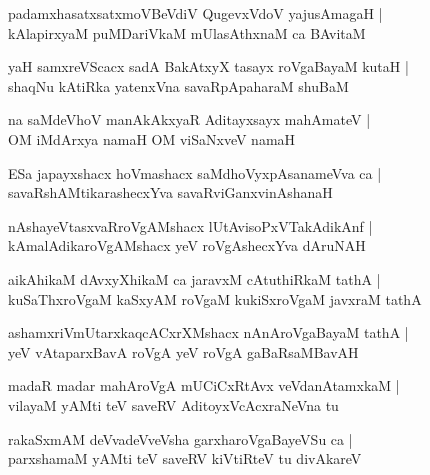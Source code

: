 \documentclass[twoside,12pt,openright]{book}
\newcounter{shloka}[chapter]
\begin{document}
\begin{shloka}%
padamxhasatxsatxmoVBeVdiV QugevxVdoV yajusAmagaH |\\
kAlapirxyaM puMDariVkaM mUlasAthxnaM ca BAvitaM 
\end{shloka}

\begin{shloka}%
yaH samxreVScacx sadA BakAtxyX tasayx roVgaBayaM kutaH |\\
shaqNu kAtiRka yatenxVna savaRpApaharaM shuBaM 
\end{shloka}

\begin{shloka}%
na saMdeVhoV manAkAkxyaR Aditayxsayx mahAmateV |\\
OM iMdArxya namaH OM viSaNxveV namaH
\end{shloka}

\begin{shloka}%
ESa japayxshacx hoVmashacx saMdhoVyxpAsanameVva ca |\\
savaRshAMtikarashecxYva savaRviGanxvinAshanaH
\end{shloka}

\begin{shloka}%
nAshayeVtasxvaRroVgAMshacx lUtAvisoPxVTakAdikAnf |\\
kAmalAdikaroVgAMshacx yeV roVgAshecxYva dAruNAH
\end{shloka}

\begin{shloka}%
aikAhikaM dAvxyXhikaM ca jaravxM cAtuthiRkaM tathA |\\
kuSaThxroVgaM kaSxyAM roVgaM kukiSxroVgaM javxraM tathA 
\end{shloka}

\begin{shloka}%
ashamxriVmUtarxkaqcACxrXMshacx nAnAroVgaBayaM tathA |\\
yeV vAtaparxBavA roVgA yeV roVgA gaBaRsaMBavAH 
\end{shloka}

\begin{shloka}%
madaR madar mahAroVgA mUCiCxRtAvx veVdanAtamxkaM |\\
vilayaM yAMti teV saveRV AditoyxVcAcxraNeVna tu
\end{shloka}

\begin{shloka}%
rakaSxmAM deVvadeVveVsha garxharoVgaBayeVSu ca |\\
parxshamaM yAMti teV saveRV kiVtiRteV tu divAkareV 
\end{shloka}
\end{document}
